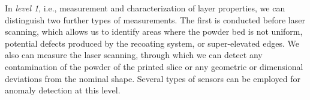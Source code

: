 In \emph{level 1}, i.e., measurement and characterization of layer properties, we can distinguish two further types of measurements. The first is conducted before laser scanning, which allows us to identify areas where the powder bed is not uniform, potential defects produced by the recoating system, or super-elevated edges. We also can measure the laser scanning, through which we can detect any contamination of the powder of the printed slice or any geometric or dimensional deviations from the nominal shape. Several types of sensors can be employed for anomaly detection at this level.
\begin{figure}
    \centering
    \qquad
    \subfloat[\label{fig:fig:offaxialebm}]{
}
\end{figure}
